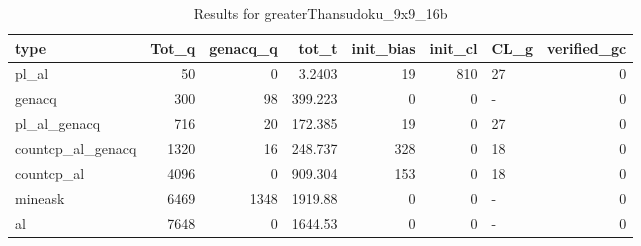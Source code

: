 \begin{table}[ht]
\caption{Results for greaterThansudoku_9x9_16b}
\begin{tabular}{lrrrrrlr}
\hline
 type              &   Tot\_q &   genacq\_q &     tot\_t &   init\_bias &   init\_cl & CL\_g   &   verified\_gc \\
\hline
 pl\_al             &      50 &          0 &    3.2403 &          19 &       810 & 27     &             0 \\
 genacq            &     300 &         98 &  399.223  &           0 &         0 & -      &             0 \\
 pl\_al\_genacq      &     716 &         20 &  172.385  &          19 &         0 & 27     &             0 \\
 countcp\_al\_genacq &    1320 &         16 &  248.737  &         328 &         0 & 18     &             0 \\
 countcp\_al        &    4096 &          0 &  909.304  &         153 &         0 & 18     &             0 \\
 mineask           &    6469 &       1348 & 1919.88   &           0 &         0 & -      &             0 \\
 al                &    7648 &          0 & 1644.53   &           0 &         0 & -      &             0 \\
\hline
\end{tabular}
\end{table}